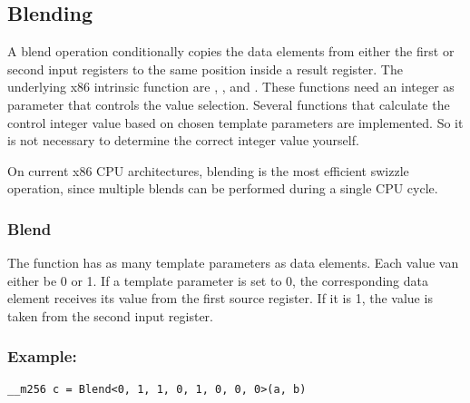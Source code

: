 \subsection{Blending}

A blend operation conditionally copies the data elements from either the first or second input registers to the same position inside a result register. 
The underlying x86 intrinsic function are , ,  and .
These functions need an integer as parameter that controls the value selection.
Several functions that calculate the control integer value based on chosen template parameters are implemented.
So it is not necessary to determine the correct integer value yourself.

On current x86 CPU architectures, blending is the most efficient swizzle operation, since multiple blends can be performed during a single CPU cycle.

\subsubsection{Blend}

The  function has as many template parameters as data elements.
Each value van either be 0 or 1.
If a template parameter is set to 0, the corresponding data element receives its value from the first source register.
If it is 1, the value is taken from the second input register.

\subsubsection*{Example:}
\begin{verbatim}
__m256 c = Blend<0, 1, 1, 0, 1, 0, 0, 0>(a, b)
\end{verbatim}




